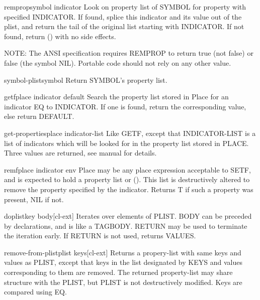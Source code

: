 \documentclass[10pt,english]{book}
\begin{document}
\begin{function}{remprop}{symbol indicator}
  Look on property list of SYMBOL for property with specified
  INDICATOR. If found, splice this indicator and its value out of
  the plist, and return the tail of the original list starting with
  INDICATOR. If not found, return () with no side effects.

  NOTE: The ANSI specification requires REMPROP to return true (not false)
  or false (the symbol NIL). Portable code should not rely on any other value.
\end{function}

\begin{accessor}{symbol-plist}{symbol}
  Return SYMBOL's property list.
\end{accessor}

\begin{accessor}{getf}{place indicator \op default}
  Search the property list stored in Place for an indicator EQ to INDICATOR.
  If one is found, return the corresponding value, else return DEFAULT.
\end{accessor}

\begin{function}{get-properties}{place indicator-list}
  Like GETF, except that INDICATOR-LIST is a list of indicators which will
  be looked for in the property list stored in PLACE. Three values are
  returned, see manual for details.
\end{function}

\begin{macro}{remf}{place indicator \env env}
  Place may be any place expression acceptable to SETF, and is expected
  to hold a property list or (). This list is destructively altered to
  remove the property specified by the indicator. Returns T if such a
  property was present, NIL if not.
\end{macro}

\begin{macro}{doplist}{key \body body}[cl-ext]
  Iterates over elements of PLIST. BODY can be preceded by
declarations, and is like a TAGBODY. RETURN may be used to terminate
the iteration early. If RETURN is not used, returns VALUES.
\end{macro}

\begin{function}{remove-from-plist}{plist \rest keys}[cl-ext]
  Returns a propery-list with same keys and values as PLIST, except that keys
in the list designated by KEYS and values corresponding to them are removed.
The returned property-list may share structure with the PLIST, but PLIST is
not destructively modified. Keys are compared using EQ.
\end{function}
\end{document}

